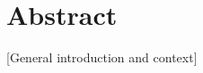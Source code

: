 \documentclass[../main.tex]{subfiles}
\begin{document}
\chapter{Abstract}

[General introduction and context]
\end{document}
